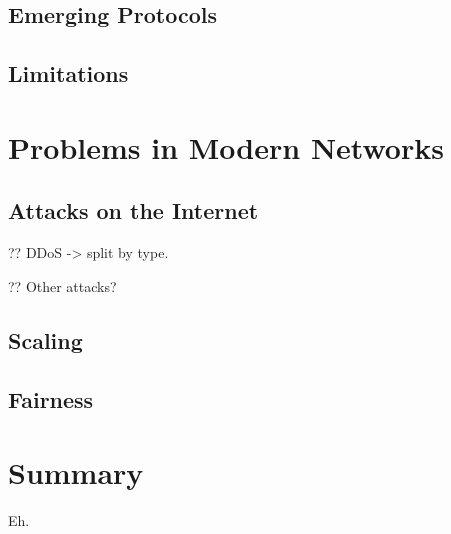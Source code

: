 \subsection{Emerging Protocols}

\subsection{Limitations}

\section{Problems in Modern Networks}

\subsection{Attacks on the Internet}

?? DDoS -> split by type.

?? Other attacks?

\subsection{Scaling}

\subsection{Fairness}

\section{Summary}
Eh.
